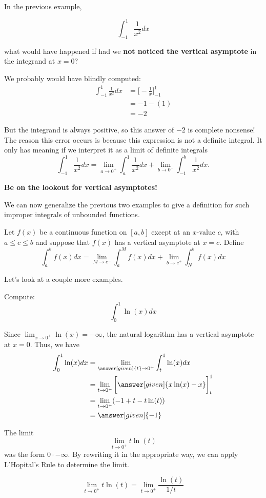 \documentclass{ximera}
\begin{document}
\begin{warning}
In the previous example,

\[
\int_{-1}^{1} \frac{1}{x^2} dx
\]

 what would have happened if had we \textbf{not
  noticed the vertical asymptote} in the integrand at $x=0$?

We probably would have blindly computed:
\begin{align*}
  \int_{-1}^1\frac1{x^2}dx &= \bigg[-\frac{1}{x}\bigg]_{-1}^1\\
  &= -1 - (1)\\
  &=-2
\end{align*}

But the integrand is always positive, so this answer of $-2$ is
complete nonsense! The reason this error occurs is because this expression is not a definite integral. It only has meaning if we
interpret it as a limit of definite integrals 
\[
 \int_{-1}^1 \frac{1}{x^2} dx = \lim_{a \to 0^+} \int_{a}^1 \frac{1}{x^2} dx  + \lim_{b \to 0^-} \int_{-1}^{b} \frac{1}{x^2} dx.
\]


\textbf{Be on the lookout for vertical asymptotes!}
\end{warning}


We can now generalize the previous two examples to give a definition for such 
improper integrals of unbounded functions.

\begin{definition}
Let $f(x)$ be a continuous function on $[a,b]$ except at an $x$-value $c$, with $a\leq
c\leq b$ and suppose that $f(x)$ has a vertical asymptote at $x=c$. Define
\[
\int_a^b f(x)dx = \lim_{M\to c^-}\int_a^M f(x)dx + \lim_{b\to c^+}\int_N^b f(x)dx
\]
\end{definition}

Let's look at a couple more examples. 


\begin{example}
  Compute:
  \[
  \int_0^1 \ln(x)dx
  \]
  \begin{explanation}
    Since $\lim_{x\to 0^+} \ln(x) = -\infty$, the natural logarithm
    has a vertical asymptote at $x = 0$. Thus, we have
    \begin{align*}
    \int_0^1 \ln(x) dx &=\lim_{\answer[given]{t}\to 0^+} \int_t^1 \ln(x) dx \\
    &= \lim_{t\to 0^+} \bigg[\answer[given]{x \ln(x)-x}\bigg]_t^1 \\
    &=\lim_{t \to 0^{+}} ( -1 + t - t\ln(t) ) \\
&=\answer[given]{ -1} 
      \end{align*}
\begin{hint}
The limit 
\[
\lim_{t \to 0^{+}} t\ln(t)
\]
was the form $0\cdot -\infty$. By rewriting it in the appropriate way, we can apply L'Hopital's Rule to 
determine the limit. 

\[
\lim_{t \to 0^{+}} t\ln(t) =\lim_{t \to 0^{+}} \frac{\ln(t)}{1/t}
\]
\end{hint}
  \end{explanation}
\end{example}
\end{document}
